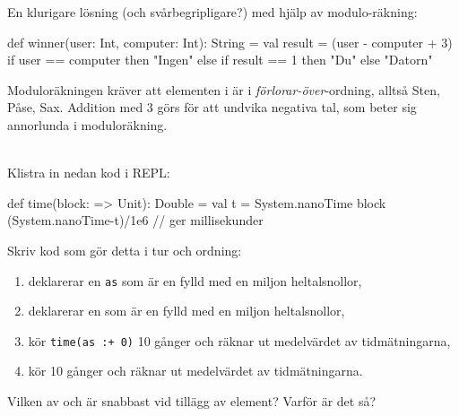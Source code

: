 En klurigare lösning (och svårbegripligare?) med hjälp av modulo-räkning:

\begin{Code}
def winner(user: Int, computer: Int): String = 
  val result = (user - computer + 3) %
  if user == computer then "Ingen"
  else if result == 1 then "Du"
  else "Datorn"
\end{Code}
Moduloräkningen kräver att elementen i  är i \emph{förlorar-över}-ordning, alltså Sten, Påse, Sax. Addition med 3 görs för att undvika negativa tal, som beter sig annorlunda i moduloräkning.

\QUESTEND




\QUESTBEGIN

\Task\Uberkurs \what~\\
Klistra in nedan kod i REPL:
\begin{Code}
def time(block: => Unit): Double =
  val t = System.nanoTime
  block
  (System.nanoTime-t)/1e6  // ger millisekunder
\end{Code}

\Subtask Skriv kod som gör detta i tur och ordning:
\begin{enumerate}
  \item deklarerar en  \texttt{as} som är en  fylld med en miljon heltalsnollor,
  \item deklarerar en  som är en  fylld med en miljon heltalsnollor,
  \item kör \texttt{time(as :+ 0)} 10 gånger och räknar ut medelvärdet av tidmätningarna,
  \item kör  10 gånger och räknar ut medelvärdet av tidmätningarna.
\end{enumerate}

\Subtask Vilken av  och  är snabbast vid tillägg av element? Varför är det så?

\SOLUTION

\TaskSolved \what~

